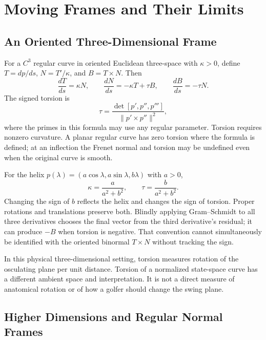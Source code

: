 \documentclass[12pt, openany]{book}
\theoremstyle{plain}
\begin{document}
\section{Moving Frames and Their Limits}

\subsection{An Oriented Three-Dimensional Frame}

For a $C^3$ regular curve in oriented Euclidean three-space with $\kappa>0$,
define $T=dp/ds$, $N=T'/\kappa$, and $B=T\times N$. Then
\begin{equation}\label{eq:frenet_serret}
 \frac{dT}{ds}=\kappa N,\qquad
 \frac{dN}{ds}=-\kappa T+\tau B,\qquad
 \frac{dB}{ds}=-\tau N.
\end{equation}
The signed torsion is
\begin{equation}
 \tau=\frac{\det[p',p'',p''']}{\|p'\times p''\|^2},
\end{equation}
where the primes in this formula may use any regular parameter. Torsion
requires nonzero curvature. A planar regular curve has zero torsion where
the formula is defined; at an inflection the Frenet normal and torsion may
be undefined even when the original curve is smooth.

For the helix $p(\lambda)=(a\cos\lambda,a\sin\lambda,b\lambda)$ with $a>0$,
\begin{equation}
 \kappa=\frac{a}{a^2+b^2},\qquad \tau=\frac{b}{a^2+b^2}.
\end{equation}
Changing the sign of $b$ reflects the helix and changes the sign of torsion.
Proper rotations and translations preserve both. Blindly applying
Gram--Schmidt to all three derivatives chooses the final vector from the
third derivative's residual; it can produce $-B$ when torsion is negative.
That convention cannot simultaneously be identified with the oriented
binormal $T\times N$ without tracking the sign.

In this physical three-dimensional setting, torsion measures rotation of the
osculating plane per unit distance. Torsion of a normalized state-space curve
has a different ambient space and interpretation. It is not a direct measure
of anatomical rotation or of how a golfer should change the swing plane.

\subsection{Higher Dimensions and Regular Normal Frames}
\end{document}
